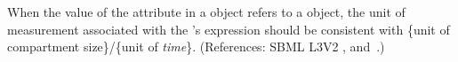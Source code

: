 When the value of the attribute  in a \RateRule object
refers to a \Compartment object, the unit of measurement associated with
the \RateRule's  expression should be consistent with \{unit of
compartment size\}/\{unit of \emph{time}\}.  (References: SBML L3V2
, 
and~.)
